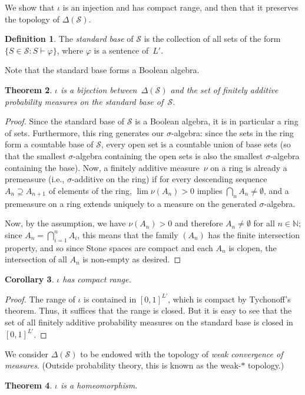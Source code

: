 \documentclass[12pt]{article}
\newcommand{\vp}{\varphi}
\newcommand{\cL}{L'}
\newcommand{\cS}{\mathcal{S}}
\theoremstyle{plain}
\newtheorem{theorem}{Theorem}[subsection]
\newtheorem{corollary}[theorem]{Corollary}
\theoremstyle{definition}
\newtheorem{definition}[theorem]{Definition}
\theoremstyle{remark}
\begin{document}
We show that $\iota$ is an injection and has compact range, and then that it preserves the topology of $\Delta(\cS)$.
\begin{definition}
The \emph{standard base} of $\cS$ is the collection of all sets of the form $\{S\in\cS : S\vdash\vp\}$, where $\vp$ is a sentence of~$\cL$.
\end{definition}
Note that the standard base forms a Boolean algebra.
\begin{theorem}
$\iota$ is a bijection between~$\Delta(\cS)$ and the set of finitely additive probability measures on the standard base of~$\cS$.
\end{theorem}
\begin{proof}
Since the standard base of $\cS$ is a Boolean algebra, it is in particular a ring of sets. Furthermore, this ring generates our $\sigma$-algebra: since the sets in the ring form a countable base of $\cS$, every open set is a countable union of base sets (so that the smallest $\sigma$-algebra containing the open sets is also the smallest $\sigma$-algebra containing the base).
Now, a finitely additive measure~$\nu$ on a ring is already a premeasure (i.e., $\sigma$-additive on the ring) if for every descending sequence $A_n\supseteq A_{n+1}$ of elements of the ring, $\lim \nu(A_n) > 0$ implies $\textstyle\bigcap_n A_n \neq\emptyset$, and a premeasure on a ring extends uniquely to a measure on the generated $\sigma$-algebra. 

Now, by the assumption, we have $\nu(A_n) > 0$ and therefore $A_n\neq\emptyset$ for all $n\in\mathbb{N}$; since $\textstyle A_n = \bigcap_{i=1}^n A_i$, this means that the family $(A_n)$ has the finite intersection property, and so since Stone spaces are compact and each $A_n$ is clopen, the intersection of all $A_n$ is non-empty as desired.
\end{proof}
\begin{corollary}
$\iota$ has compact range.
\end{corollary}
\begin{proof}
The range of $\iota$ is contained in $[0,1]^{L'}$, which is compact by Tychonoff's theorem. Thus, it suffices that the range is closed. But it is easy to see that the set of all finitely additive probability measures on the standard base is closed in $[0,1]^{L'}$.
\end{proof}
We consider $\Delta(\cS)$ to be endowed with the topology of \emph{weak convergence of measures}. (Outside probability theory, this is known as the weak-$*$ topology.)
\begin{theorem}
$\iota$ is a homeomorphism.
\end{theorem}
\end{document}
